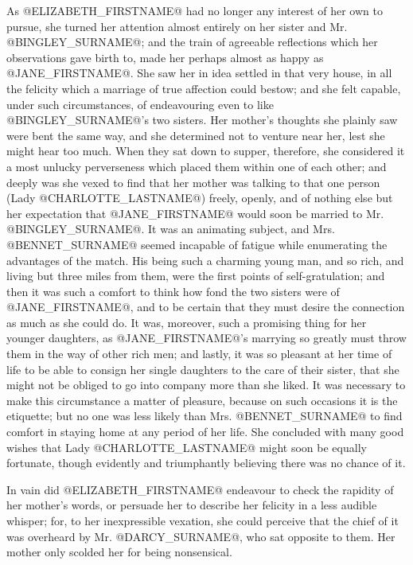 As @ELIZABETH_FIRSTNAME@ had no longer any interest of her own to pursue, she turned
her attention almost entirely on her sister and Mr. @BINGLEY_SURNAME@; and the
train of agreeable reflections which her observations gave birth to,
made her perhaps almost as happy as @JANE_FIRSTNAME@. She saw her in idea settled in
that very house, in all the felicity which a marriage of true affection
could bestow; and she felt capable, under such circumstances, of
endeavouring even to like @BINGLEY_SURNAME@'s two sisters. Her mother's thoughts
she plainly saw were bent the same way, and she determined not to
venture near her, lest she might hear too much. When they sat down to
supper, therefore, she considered it a most unlucky perverseness which
placed them within one of each other; and deeply was she vexed to find
that her mother was talking to that one person (Lady @CHARLOTTE_LASTNAME@) freely,
openly, and of nothing else but her expectation that @JANE_FIRSTNAME@ would soon
be married to Mr. @BINGLEY_SURNAME@. It was an animating subject, and Mrs. @BENNET_SURNAME@
seemed incapable of fatigue while enumerating the advantages of the
match. His being such a charming young man, and so rich, and living but
three miles from them, were the first points of self-gratulation; and
then it was such a comfort to think how fond the two sisters were of
@JANE_FIRSTNAME@, and to be certain that they must desire the connection as much as
she could do. It was, moreover, such a promising thing for her younger
daughters, as @JANE_FIRSTNAME@'s marrying so greatly must throw them in the way of
other rich men; and lastly, it was so pleasant at her time of life to be
able to consign her single daughters to the care of their sister, that
she might not be obliged to go into company more than she liked. It was
necessary to make this circumstance a matter of pleasure, because on
such occasions it is the etiquette; but no one was less likely than Mrs.
@BENNET_SURNAME@ to find comfort in staying home at any period of her life. She
concluded with many good wishes that Lady @CHARLOTTE_LASTNAME@ might soon be equally
fortunate, though evidently and triumphantly believing there was no
chance of it.

In vain did @ELIZABETH_FIRSTNAME@ endeavour to check the rapidity of her mother's
words, or persuade her to describe her felicity in a less audible
whisper; for, to her inexpressible vexation, she could perceive that the
chief of it was overheard by Mr. @DARCY_SURNAME@, who sat opposite to them. Her
mother only scolded her for being nonsensical.

